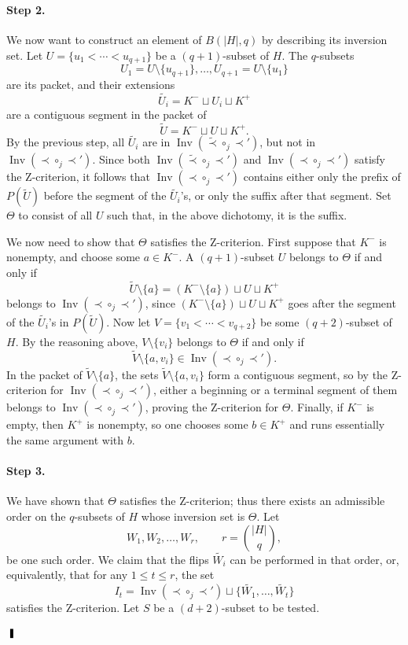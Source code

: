 \documentclass[12pt,a4paper]{article}
\newenvironment{proof}{\noindent{\bf Proof}~}%
{\hfill$\qed$\medskip}
\def\qed{ \ \vrule width.1cm height.3cm depth0cm}
\begin{document}
\begin{proof}
\paragraph{Step 2.}
We now want to construct an element of \(B(|H|,q)\) by describing its inversion set.
Let \(U = \{u_1 < \cdots < u_{q+1}\}\) be a \((q+1)\)-subset of \(H\). The
\(q\)-subsets
\[
U_1 = U \setminus \{u_{q+1}\}, \ldots, U_{q+1} = U \setminus \{u_1\}
\]
are its packet, and their extensions
\[
\widetilde{U_i} = K^{-} \sqcup U_i \sqcup K^{+}
\]
are a contiguous segment in the packet of
\[
\widetilde U = K^{-} \sqcup U \sqcup K^{+}.
\]
By the previous step, all \(\widetilde{U_i}\) are in
\(\operatorname{Inv}(\widetilde{\prec}\circ_j\prec')\), but not in
\(\operatorname{Inv}(\prec\circ_j\prec')\). Since both
\(\operatorname{Inv}(\widetilde{\prec}\circ_j\prec')\) and
\(\operatorname{Inv}(\prec\circ_j\prec')\) satisfy the Z-criterion, it follows that
\(\operatorname{Inv}(\prec\circ_j\prec')\) contains either only the prefix of
\(P(\widetilde U)\) before the segment of the \(\widetilde{U_i}\)'s, or only the suffix
after that segment. Set \(\Theta\) to consist of all \(U\) such that, in the above
dichotomy, it is the suffix.

We now need to show that \(\Theta\) satisfies the Z-criterion. First suppose that
\(K^{-}\) is nonempty, and choose some \(a \in K^{-}\). A \((q+1)\)-subset \(U\)
belongs to \(\Theta\) if and only if
\[
\widetilde U \setminus \{a\}
=
(K^{-} \setminus \{a\}) \sqcup U \sqcup K^{+}
\]
belongs to \(\operatorname{Inv}(\prec\circ_j\prec')\), since
\((K^{-} \setminus \{a\}) \sqcup U \sqcup K^{+}\) goes after the segment of the
\(\widetilde{U_i}\)'s in \(P(\widetilde U)\). Now let
\(V = \{v_1 < \cdots < v_{q+2}\}\) be some \((q+2)\)-subset of \(H\). By the
reasoning above, \(V \setminus \{v_i\}\) belongs to \(\Theta\) if and only if
\[
\widetilde V \setminus \{a,v_i\} \in \operatorname{Inv}(\prec\circ_j\prec').
\]
In the packet of \(\widetilde V \setminus \{a\}\), the sets
\(\widetilde V \setminus \{a,v_i\}\) form a contiguous segment, so by the Z-criterion
for \(\operatorname{Inv}(\prec\circ_j\prec')\), either a beginning or a terminal segment
of them belongs to \(\operatorname{Inv}(\prec\circ_j\prec')\), proving the Z-criterion
for \(\Theta\). Finally, if \(K^{-}\) is empty, then \(K^{+}\) is nonempty, so one
chooses some \(b \in K^{+}\) and runs essentially the same argument with \(b\).

\paragraph{Step 3.}
We have shown that \(\Theta\) satisfies the Z-criterion; thus there exists an
admissible order on the \(q\)-subsets of \(H\) whose inversion set is \(\Theta\). Let
\[
W_1, W_2, \ldots, W_r,
\qquad
r = \binom{|H|}{q},
\]
be one such order. We claim that the flips \(\widetilde{W_i}\) can be performed in
that order, or, equivalently, that for any \(1 \leq t \leq r\), the set
\[
I_t = \operatorname{Inv}(\prec\circ_j\prec')
      \sqcup \{\widetilde{W_1}, \ldots, \widetilde{W_t}\}
\]
satisfies the Z-criterion. Let \(S\) be a \((d+2)\)-subset to be tested.


\end{proof}
\end{document}
